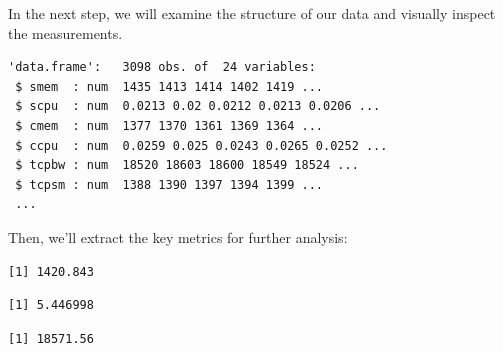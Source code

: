In the next step, we will examine the structure of our data and visually
inspect the measurements.

\begin{Shaded}
\begin{Highlighting}[]
\end{Highlighting}
\end{Shaded}

\begin{verbatim}
'data.frame':   3098 obs. of  24 variables:
 $ smem  : num  1435 1413 1414 1402 1419 ...
 $ scpu  : num  0.0213 0.02 0.0212 0.0213 0.0206 ...
 $ cmem  : num  1377 1370 1361 1369 1364 ...
 $ ccpu  : num  0.0259 0.025 0.0243 0.0265 0.0252 ...
 $ tcpbw : num  18520 18603 18600 18549 18524 ...
 $ tcpsm : num  1388 1390 1397 1394 1399 ...
 ...
\end{verbatim}

Then, we'll extract the key metrics for further analysis:

\begin{Shaded}
\begin{Highlighting}[]
\SpecialCharTok{\$}
\end{Highlighting}
\end{Shaded}

\begin{verbatim}
[1] 1420.843
\end{verbatim}

\begin{Shaded}
\begin{Highlighting}[]
\SpecialCharTok{\$}
\end{Highlighting}
\end{Shaded}

\begin{verbatim}
[1] 5.446998
\end{verbatim}

\begin{Shaded}
\begin{Highlighting}[]
\SpecialCharTok{\$}
\end{Highlighting}
\end{Shaded}

\begin{verbatim}
[1] 18571.56
\end{verbatim}

\begin{Shaded}
\begin{Highlighting}[]
\SpecialCharTok{\$}
\end{Highlighting}
\end{Shaded}

